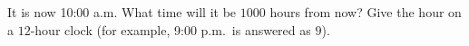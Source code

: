 It is now 10:00 a.m. What time will it be $1000$ hours from now? Give the hour on a $12$-hour clock (for example, 9:00 p.m.\ is answered as $9$).
